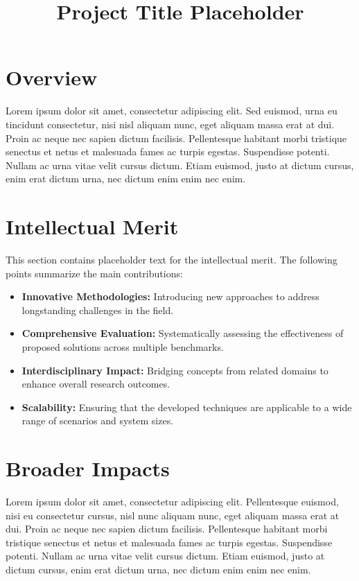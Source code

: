 \documentclass[tight,nopagenumbers]{proposal}
\title{Project Title Placeholder}
\begin{document}
\maketitle

\section*{Overview}

Lorem ipsum dolor sit amet, consectetur adipiscing elit. Sed euismod, urna eu tincidunt consectetur, nisi nisl aliquam nunc, eget aliquam massa erat at dui. Proin ac neque nec sapien dictum facilisis. Pellentesque habitant morbi tristique senectus et netus et malesuada fames ac turpis egestas. Suspendisse potenti. Nullam ac urna vitae velit cursus dictum. Etiam euismod, justo at dictum cursus, enim erat dictum urna, nec dictum enim enim nec enim.

\section*{Intellectual Merit}

This section contains placeholder text for the intellectual merit. The following points summarize the main contributions:

\begin{itemize}
    \item \textbf{Innovative Methodologies:} Introducing new approaches to address longstanding challenges in the field.
    \item \textbf{Comprehensive Evaluation:} Systematically assessing the effectiveness of proposed solutions across multiple benchmarks.
    \item \textbf{Interdisciplinary Impact:} Bridging concepts from related domains to enhance overall research outcomes.
    \item \textbf{Scalability:} Ensuring that the developed techniques are applicable to a wide range of scenarios and system sizes.
\end{itemize}

\section*{Broader Impacts}

Lorem ipsum dolor sit amet, consectetur adipiscing elit. Pellentesque euismod, nisi eu consectetur cursus, nisl nunc aliquam nunc, eget aliquam massa erat at dui. Proin ac neque nec sapien dictum facilisis. Pellentesque habitant morbi tristique senectus et netus et malesuada fames ac turpis egestas. Suspendisse potenti. Nullam ac urna vitae velit cursus dictum. Etiam euismod, justo at dictum cursus, enim erat dictum urna, nec dictum enim enim nec enim.
\end{document}
